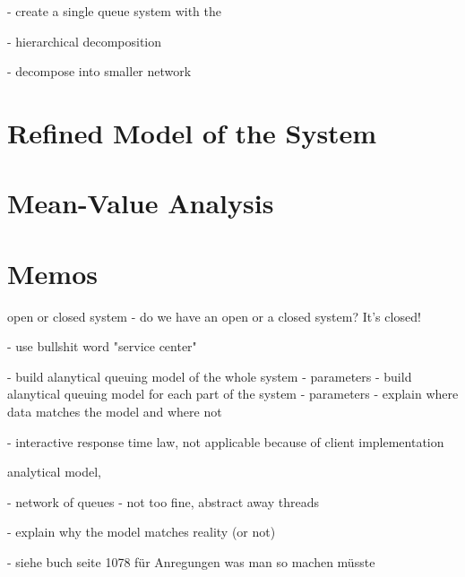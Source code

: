 \documentclass[a4paper]{article}
\begin{document}
- create a single queue system with the 

- hierarchical decomposition

- decompose into smaller network

\section{Refined Model of the System}

\section{Mean-Value Analysis}


\section{Memos}

open or closed system
- do we have an open or a closed system? It's closed!

- use bullshit word "service center"

- build alanytical queuing model of the whole system
  - parameters
- build alanytical queuing model for each part of the system
  - parameters
- explain where data matches the model and where not

- interactive response time law, not applicable because of client implementation

analytical model, 


- network of queues
  - not too fine, abstract away threads
  
  
- explain why the model matches reality (or not)


- siehe buch seite 1078 für Anregungen was man so machen müsste
\end{document}
